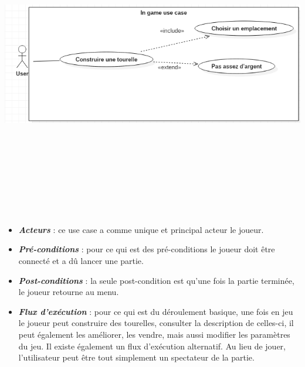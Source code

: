 \documentclass[10pt,a4paper]{article}
\begin{document}
\begin{center}
    \includegraphics[height=13.5cm,width=17cm]{ingame_use_case.png}
\end{center}

\begin{itemize}
\item \textit{\textbf{Acteurs}} : ce use case a comme unique et principal acteur le \gls{joueur}.\\

\item \textit{\textbf{Pré-conditions}} : pour ce qui est des pré-conditions le \gls{joueur} doit être connecté et a dû lancer une partie.\\

\item \textit{\textbf{Post-conditions}} : la seule post-condition est qu'une fois la partie terminée, le \gls{joueur} retourne au menu.\\

\item \textit{\textbf{Flux d'exécution}} : pour ce qui est du déroulement basique, une fois en jeu le \gls{joueur} peut construire des tourelles, consulter la description de celles-ci, il peut également les améliorer, les vendre, mais aussi modifier les paramètres du jeu. Il existe également un flux d'exécution alternatif. Au lieu de jouer, l'\gls{utilisateur} peut être tout simplement un spectateur de la partie.

\end{itemize}
\end{document}
